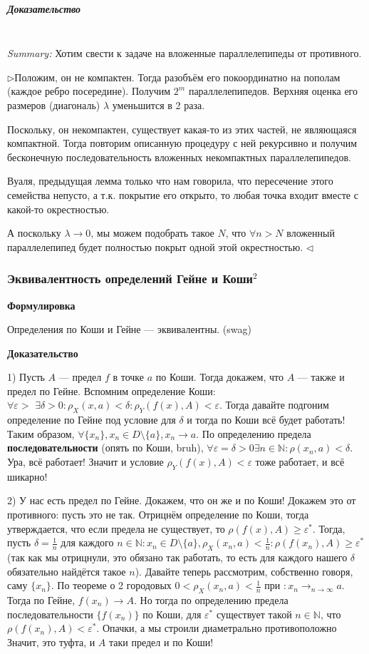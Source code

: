 \documentclass{article}
\def\dbl{\,\,}
\let\vanillasubparagraph\subparagraph
\renewcommand{\subparagraph}[1]{\vanillasubparagraph{#1}\mbox{}\\}
\begin{document}
\subparagraph{Доказательство}
\textit{Summary:} Хотим свести к задаче на вложенные параллелепипеды от противного.

$\rhd$Положим, он не компактен. Тогда разобъём его покоординатно на пополам (каждое ребро посередине). Получим $2^m$ параллелепипедов. Верхняя оценка его размеров (диагональ) $\lambda$ уменьшится в 2 раза. 

Поскольку, он некомпактен, существует какая-то из этих частей, не являющаяся компактной. Тогда повторим описанную процедуру с ней рекурсивно и получим бесконечную последовательность вложенных некомпактных параллелепипедов. 

Вуаля, предыдущая лемма только что нам говорила, что пересечение этого семейства непусто, а т.к. покрытие его открыто, то любая точка входит вместе с какой-то окрестностью.

А поскольку $\lambda \rightarrow 0$, мы можем подобрать такое $N$, что $\forall n > N$ вложенный параллелепипед будет полностью покрыт одной этой окрестностью. $\lhd$

\subsubsection{Эквивалентность определений Гейне и Коши\texorpdfstring{$^2$}{}}

\textbf{Формулировка}

Определения по Коши и Гейне --- эквивалентны. (swag)

\textbf{Доказательство}

1) Пусть $A$ --- предел $f$ в точке $a$ по Коши. Тогда докажем, что $A$ --- также и предел по Гейне. Вспомним определение Коши: $\forall \varepsilon > \dbl \exists \delta > 0 : \rho_X(x, a) < \delta : \rho_Y(f(x), A) < \varepsilon$. Тогда давайте подгоним определение по Гейне под условие для $\delta$ и тогда по Коши всё будет работать! Таким образом, $\forall \{x_n\}, x_n \in D \setminus \{a\}, x_n \rightarrow a$. По определению предела \textbf{последовательности} (опять по Коши, bruh), $\forall \varepsilon = \delta > 0 \exists n \in \mathbb{N} : \rho(x_n, a) < \delta$. Ура, всё работает! Значит и условие $\rho_Y(f(x), A) < \varepsilon$ тоже работает, и всё шикарно!

2) У нас есть предел по Гейне. Докажем, что он же и по Коши! Докажем это от противного: пусть это не так. Отрицнём определение по Коши, тогда утверждается, что если предела не существует, то $\rho(f(x), A) \ge \varepsilon^*$. Тогда, пусть $\delta = \frac{1}{n}$ для каждого $n \in \mathbb{N} : x_n \in D \setminus \{a\}, \rho_X(x_n, a) < \frac{1}{n} : \rho(f(x_n), A) \ge \varepsilon^*$ (так как мы отрицнули, это обязано так работать, то есть для каждого нашего $\delta$ обязательно найдётся такое $n$). Давайте теперь рассмотрим, собственно говоря, саму $\{x_n\}$. По теореме о 2 городовых $0 < \rho_X(x_n, a) < \frac{1}{n}$ при $: x_n \rightarrow_{n \rightarrow \infty} a$. Тогда по Гейне, $f(x_n) \rightarrow A$. Но тогда по определению предела последовательности $\{f(x_n)\}$ по Коши, для $\varepsilon^*$ существует такой $n \in \mathbb{N}$, что $\rho(f(x_n), A) < \varepsilon^*$. Опачки, а мы строили диаметрально противоположно Значит, это туфта, и $A$ таки предел и по Коши!
\end{document}
